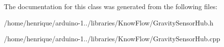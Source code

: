 The documentation for this class was generated from the following files\+:\begin{DoxyCompactItemize}
\item 
/home/henrique/arduino-\/1../libraries/\+Know\+Flow/Gravity\+Sensor\+Hub.\+h\item 
/home/henrique/arduino-\/1../libraries/\+Know\+Flow/Gravity\+Sensor\+Hub.\+cpp\end{DoxyCompactItemize}
